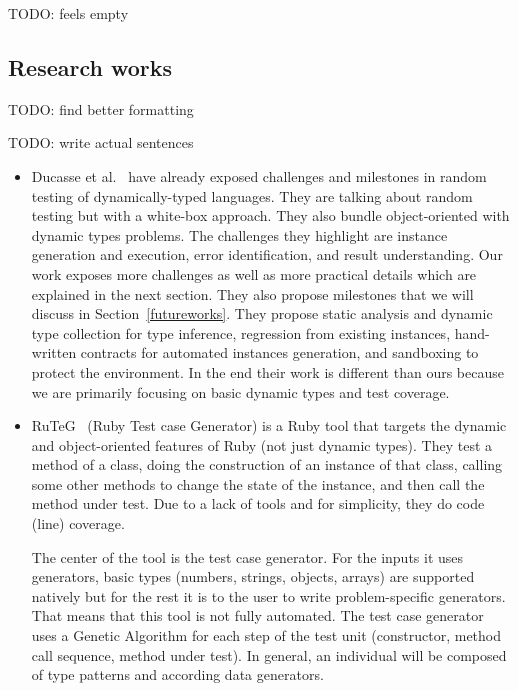 \documentclass{llncs2e/llncs}
\makeatletter
\def\todo#1{{\color{red}TODO\@: #1}}
\makeatother
\begin{document}
\todo{feels empty}

\subsection{Research works}
\label{related_research}

\todo{find better formatting}

\todo{write actual sentences}

\begin{itemize}
  \item Ducasse et al.~\cite{ducasse2011challenges} have already exposed
    challenges and milestones in random testing of dynamically-typed languages.
    They are talking about random testing but with a white-box approach. They
    also bundle object-oriented with dynamic types problems. The challenges they
    highlight are instance generation and execution, error identification, and
    result understanding. Our work exposes more challenges as well as more
    practical details which are explained in the next section. They also propose
    milestones that we will discuss in Section~\ref{futureworks}. They propose
    static analysis and dynamic type collection for type inference, regression
    from existing instances, hand-written contracts for automated instances
    generation, and sandboxing to protect the environment. In the end their work
    is different than ours because we are primarily focusing on basic dynamic
    types and test coverage.

  \item RuTeG~\cite{mairhofer2011search} (Ruby Test case Generator) is a Ruby
    tool that targets the dynamic and object-oriented features of Ruby (not just
    dynamic types). They test a method of a class, doing the construction of an
    instance of that class, calling some other methods to change the state of
    the instance, and then call the method under test. Due to a lack of tools
    and for simplicity, they do code (line) coverage.

    The center of the tool is the test case generator. For the inputs it uses
    generators, basic types (numbers, strings, objects, arrays) are supported
    natively but for the rest it is to the user to write problem-specific
    generators. That means that this tool is not fully automated. The test case
    generator uses a Genetic Algorithm for each step of the test unit
    (constructor, method call sequence, method under test). In general, an
    individual will be composed of type patterns and according data generators.


\end{itemize}
\end{document}
